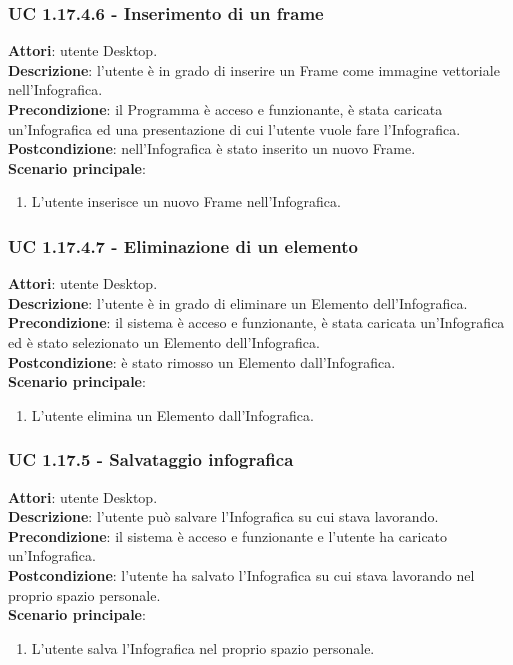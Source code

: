 \subsubsection{UC 1.17.4.6 - Inserimento di un frame}{
	\label{uc1.17.4.6}
	\textbf{Attori}: utente Desktop. \\
	\textbf{Descrizione}: l'utente è in grado di inserire un Frame come immagine vettoriale nell'Infografica. \\
	\textbf{Precondizione}: il Programma è acceso e funzionante, è stata caricata un'Infografica ed una presentazione di cui l'utente vuole fare l'Infografica.	\\
	\textbf{Postcondizione}: nell'Infografica è stato inserito un nuovo Frame.\\
	\textbf{Scenario principale}:
	\begin{enumerate}
		\item L'utente inserisce un nuovo Frame nell'Infografica.
	\end{enumerate}			
	}
\subsubsection{UC 1.17.4.7 - Eliminazione di un elemento}{
	\label{uc1.17.4.7}
	\textbf{Attori}: utente Desktop. \\
	\textbf{Descrizione}: l'utente è in grado di eliminare un Elemento dell'Infografica. \\
	\textbf{Precondizione}: il sistema è acceso e funzionante, è stata caricata un'Infografica ed è stato selezionato un Elemento dell'Infografica.	\\
	\textbf{Postcondizione}: è stato rimosso un Elemento dall'Infografica.\\
	\textbf{Scenario principale}:
	\begin{enumerate}
		\item L'utente elimina un Elemento dall'Infografica.
	\end{enumerate}			
	}
\subsubsection{UC 1.17.5 - Salvataggio infografica}{
	\label{uc1.17.5}
	\textbf{Attori}: utente Desktop. \\
	\textbf{Descrizione}: l'utente può salvare l'Infografica su cui stava lavorando. \\
	\textbf{Precondizione}: il sistema è acceso e funzionante e l'utente ha caricato un'Infografica.	\\
	\textbf{Postcondizione}: l'utente ha salvato l’Infografica su cui stava lavorando nel proprio spazio personale.\\
	\textbf{Scenario principale}:
	\begin{enumerate}
		\item L'utente salva l'Infografica nel proprio spazio personale.
	\end{enumerate}			
	}

